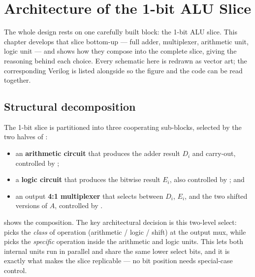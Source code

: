 \chapter{Architecture of the 1-bit ALU Slice}
\label{ch:arch}

The whole design rests on one carefully built block: the 1-bit ALU slice.
This chapter develops that slice bottom-up --- full adder, multiplexer,
arithmetic unit, logic unit --- and shows how they compose into the
complete slice, giving the reasoning behind each choice. Every schematic
here is redrawn as vector art; the corresponding Verilog is listed
alongside so the figure and the code can be read together.

\section{Structural decomposition}
The 1-bit slice is partitioned into three cooperating sub-blocks,
selected by the two halves of \sel{}:
\begin{itemize}
  \item an \textbf{arithmetic circuit} that produces the adder result
        $D_i$ and carry-out, controlled by ;
  \item a \textbf{logic circuit} that produces the bitwise result $E_i$,
        also controlled by ; and
  \item an output \textbf{4:1 multiplexer} that selects between $D_i$,
        $E_i$, and the two shifted versions of $A$, controlled by
        .
\end{itemize}
 shows the composition. The key architectural decision
is this two-level select:  picks the \emph{class} of
operation (arithmetic / logic / shift) at the output mux, while
 picks the \emph{specific} operation inside the arithmetic
and logic units. This lets both internal units run in parallel and share
the same lower select bits, and it is exactly what makes the slice
replicable --- no bit position needs special-case control.

